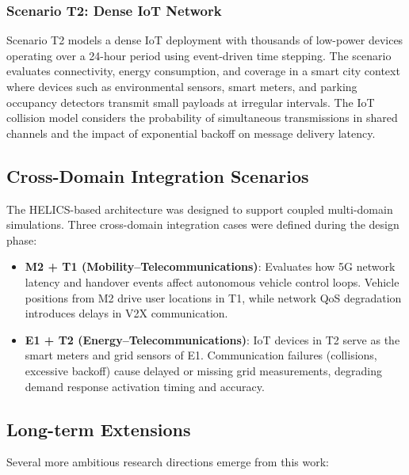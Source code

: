 \subsubsection{Scenario T2: Dense IoT Network}

Scenario T2 models a dense IoT deployment with thousands of low-power devices operating over a 24-hour period using event-driven time stepping. The scenario evaluates connectivity, energy consumption, and coverage in a smart city context where devices such as environmental sensors, smart meters, and parking occupancy detectors transmit small payloads at irregular intervals. The IoT collision model considers the probability of simultaneous transmissions in shared channels and the impact of exponential backoff on message delivery latency.

\subsection{Cross-Domain Integration Scenarios}

The HELICS-based architecture was designed to support coupled multi-domain simulations. Three cross-domain integration cases were defined during the design phase:

\begin{itemize}
    \item \textbf{M2 + T1 (Mobility--Telecommunications)}: Evaluates how 5G network latency and handover events affect autonomous vehicle control loops. Vehicle positions from M2 drive user locations in T1, while network QoS degradation introduces delays in V2X communication.
    \item \textbf{E1 + T2 (Energy--Telecommunications)}: IoT devices in T2 serve as the smart meters and grid sensors of E1. Communication failures (collisions, excessive backoff) cause delayed or missing grid measurements, degrading demand response activation timing and accuracy.
\end{itemize}

\subsection{Long-term Extensions}

Several more ambitious research directions emerge from this work:

